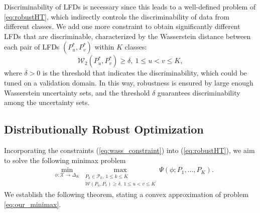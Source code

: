 \documentclass[journal]{IEEEtran}
\begin{document}

Discriminability of LFDs is necessary since this leads to a well-defined problem of \eqref{eq:robustHT}, which indirectly controls the discriminability of data from different classes.
We add one more constraint to obtain significantly different LFDs that are discriminable, characterized by the Wasserstein distance between each pair of LFDs $(P_u^*, P_v^*)$ within $K$ classes:
\begin{equation}
\label{eq:wass_constraint}
\mathcal{W}_2\left(P_u^*, P_v^*\right) \ge \delta, \  1\leq u < v \leq K,
\end{equation}
where $\delta>0$ is the threshold that indicates the discriminability, which could be tuned on a validation domain. 
In this way,  robustness is ensured by large enough Wasserstein uncertainty sets, and the threshold $\delta$ guarantees discriminability among the uncertainty sets. 


\subsection{Distributionally Robust Optimization}\label{method:3}
Incorporating the constraints (\ref{eq:wass_constraint}) into (\ref{eq:robustHT}), we aim to solve the following minimax problem
\begin{equation}
\label{eq:our_minimax}
\begin{aligned}
    & \min_{\phi:\mathcal{X}\rightarrow \Delta_K}  \max_{\substack{P_{k} \in \mathcal{P}_{k}, \ 1\leq k \leq K \\ 
    \mathcal{W}\left(P_u, P_v\right) \geq \delta, \ 1\leq u < v\leq K}}  \Psi\left(\phi; P_{1},\ldots, P_{K}\right).
\end{aligned}
\end{equation}
We establish the following theorem, stating a convex approximation of problem \eqref{eq:our_minimax}.
\end{document}
